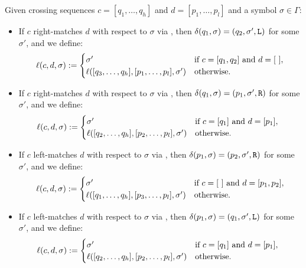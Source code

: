 \begin{defn}
	Given crossing sequences $c=[q_1,\dots,q_h]$ and $d=[p_1,\dots,p_l]$ and a symbol $\sigma\in\Gamma$:
	\begin{itemize}
		\item If $c$ right-matches $d$ with respect to $\sigma$ via , then $\delta(q_1,\sigma)=(q_2,\sigma',\mathtt L)$ for some $\sigma'$, and we define:
		      \begin{equation*}
			      \ell(c,d,\sigma):=\begin{cases}
				      \sigma'                                        & \text{if } c=[q_1,q_2] \text{ and } d=[~], \\
				      \ell([q_3,\dots,q_h],[p_1,\dots,p_l],\sigma') & \text{otherwise}.
			      \end{cases}
		      \end{equation*}
		\item If $c$ right-matches $d$ with respect to $\sigma$ via , then $\delta(q_1,\sigma)=(p_1,\sigma',\mathtt R)$ for some $\sigma'$, and we define:
		      \begin{equation*}
			      \ell(c,d,\sigma):=\begin{cases}
				      \sigma'                                        & \text{if } c=[q_1] \text{ and } d=[p_1],~~ \\
				      \ell([q_2,\dots,q_h],[p_2,\dots,p_l],\sigma') & \text{otherwise}.
			      \end{cases}
		      \end{equation*}
		\item If $c$ left-matches $d$ with respect to $\sigma$ via , then $\delta(p_1,\sigma)=(p_2,\sigma',\mathtt R)$ for some $\sigma'$, and we define:
		      \begin{equation*}
			      \ell(c,d,\sigma):=\begin{cases}
				      \sigma'                                        & \text{if } c=[~] \text{ and } d=[p_1,p_2], \\
				      \ell([q_1,\dots,q_h],[p_3,\dots,p_l],\sigma') & \text{otherwise}.
			      \end{cases}
		      \end{equation*}
		\item If $c$ left-matches $d$ with respect to $\sigma$ via , then $\delta(p_1,\sigma)=(q_1,\sigma',\mathtt L)$ for some $\sigma'$, and we define:
		      \begin{equation*}
			      \ell(c,d,\sigma):=\begin{cases}
				      \sigma'                                        & \text{if } c=[q_1] \text{ and } d=[p_1],~~ \\
				      \ell([q_2,\dots,q_h],[p_2,\dots,p_l],\sigma') & \text{otherwise}.
			      \end{cases}
		      \end{equation*}
	\end{itemize}
\end{defn}
